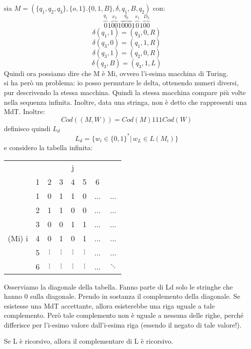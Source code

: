 \documentclass[a4paper,12pt, oneside]{book}
\begin{document}
	\begin{esempio}
		sia $M=(\{q_1,q_2,q_3\},\{o,1\}.\{0,1,B\},\delta,q_1,B,q_2)$ con:
		$$\overbrace{0}^{q_1}1\overbrace{00}^{x_2}1\overbrace{000}^{q_3}1\overbrace{0}^{x_1}1\overbrace{00}^{D_2}$$
		$$\delta(q_1,1)=(q_3,0,R)$$
		$$\delta(q_3,0)=(q_1,1,R)$$
		$$\delta(q_3,1)=(q_2,0,R)$$
		$$\delta(q_3,B)=(q_3,1,L)$$
		Quindi ora possiamo dire che M è Mi, ovvero l'i-esima macchina di Turing.
		\\
		si ha però un problema: io posso permutare le delta, ottenendo numeri diversi, pur descrivendo la stessa
		macchina. Quindi la stessa macchina compare più volte nella sequenza infinita. Inoltre, data una
		stringa, non è detto che rappresenti una MdT. Inoltre:
		$$Cod((M,W))=Cod(M)111Cod(W)$$
		definisco quindi $L_d$
		$$L_d=\{w_i\in\{0,1\}^*|\,w_L\in L(M_i)\}$$
		e considero la tabella infinita:
		\begin{center}
			\begin{tabular}{c c|c c c c c c}
				       &   &          &          & j        &          &                \\
				       & 1 & 2        & 3        & 4        & 5        & 6              \\
				\hline
				       & 1 & 0        & 1        & 1        & 0        & ... & ...      \\
				       & 2 & 1        & 1        & 0        & 0        & ... & ...      \\
				       & 3 & 0        & 0        & 1        & 1        & ... & ...      \\
				(Mi) i & 4 & 0        & 1        & 0        & 1        & ... & ...      \\
				       & 5 & $\vdots$ & $\vdots$ & $\vdots$ & $\vdots$ & ... & ...      \\
				       & 6 & $\vdots$ & $\vdots$ & $\vdots$ & $\vdots$ & ... & $\ddots$
			\end{tabular}
		\end{center}
		Osserviamo la diagonale della tabella. Fanno parte di Ld solo le stringhe che hanno 0 sulla
		diagonale. Prendo in sostanza il complemento della diagonale.
		Se esistesse una MdT accettante, allora esisterebbe una riga uguale a tale complemento.
		Però tale complemento non è uguale a nessuna delle righe, perché differisce per l'i-esimo valore
		dall'i-esima riga (essendo il negato di tale valore!).
	\end{esempio}
	\begin{teorema}
		Se L è ricorsivo, allora il complementare di L è ricorsivo.
	\end{teorema}
\end{document}
